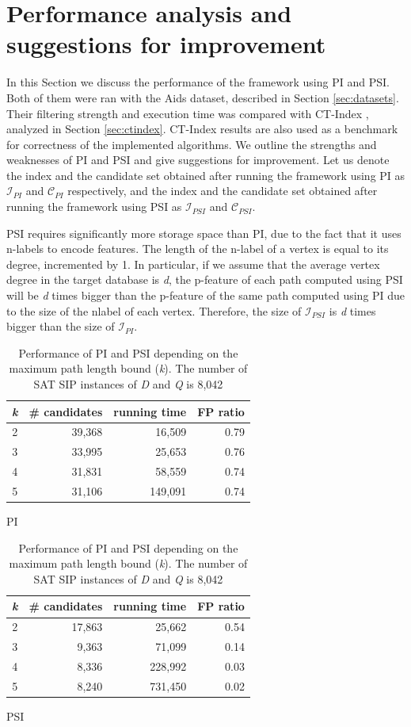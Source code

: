 \documentclass{l4proj}
\newcommand{\fancyI}{\mathcal{I}}
\newcommand{\fancyC}{\mathcal{C}}
\begin{document}
\section{Performance analysis and suggestions for improvement}
\label{sec:performance}
In this Section we discuss the performance of the framework using PI and PSI. Both of them were ran with the Aids dataset, described in Section \ref{sec:datasets}. Their filtering strength and execution time was compared with CT-Index \cite{ctindex}, analyzed in Section \ref{sec:ctindex}. CT-Index results are also used as a benchmark for correctness of the implemented algorithms. We outline the strengths and weaknesses of PI and PSI and give suggestions for improvement.
Let us denote the index and the candidate set obtained after running the framework using PI as $\fancyI_{PI}$ and $\fancyC_{PI}$ respectively, and the index and the candidate set obtained after running the framework using PSI as $\fancyI_{PSI}$ and $\fancyC_{PSI}$. 

PSI requires significantly more storage space than PI, due to the fact that it uses n-labels to encode features. The length of the n-label of a vertex is equal to its degree, incremented by 1. In particular, if we assume that the average vertex degree in the target database is \emph{d}, the p-feature of each path computed using PSI will be \emph{d} times bigger than the p-feature of the same path computed using PI due to the size of the nlabel of each vertex. Therefore, the size of $\fancyI_{PSI}$ is \emph{d} times bigger than the size of $\fancyI_{PI}$.

\begin{table}
\renewcommand{\arraystretch}{1.2}
\parbox{.45\linewidth}{
\centering
\begin{tabular}{|c|r|r|r|}
\hline
  \emph{k} & \# candidates & running time & FP ratio\\
  \hline
  2 & 39,368 & 16,509 & 0.79 \\
  3 & 33,995 & 25,653 & 0.76 \\
  4 & 31,831 & 58,559 & 0.74 \\
  5 & 31,106 & 149,091 & 0.74 \\
 \hline
\end{tabular}
\caption{PI}\label{table:PI}
}
\parbox{.45\linewidth}{
\centering
\begin{tabular}{ |c|r|r|r|}
\hline
  \emph{k} & \# candidates & running time & FP ratio\\
  \hline
  2 & 17,863 & 25,662 & 0.54 \\
  3 & 9,363  & 71,099 & 0.14 \\
  4 & 8,336  & 228,992 & 0.03 \\
  5 & 8,240  & 731,450 & 0.02 \\
 \hline
\end{tabular}
\caption{PSI}\label{table:PSI}
}
\caption{Performance of PI and PSI depending on the maximum path length bound (\emph{k}). The number of SAT SIP instances of \emph{D} and \emph{Q} is 8,042}
\label{table:PIandPSI}
\end{table}
\end{document}
